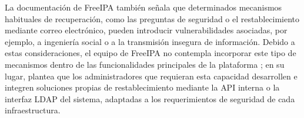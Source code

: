 La documentación de FreeIPA también señala que determinados mecanismos habituales de recuperación, como las preguntas de seguridad o el restablecimiento mediante correo electrónico, pueden introducir vulnerabilidades asociadas, por ejemplo, a ingeniería social o a la transmisión insegura de información. Debido a estas consideraciones, el equipo de FreeIPA no contempla incorporar este tipo de mecanismos dentro de las funcionalidades principales de la plataforma \citep{FreeIPAReset2026}; en su lugar, plantea que los administradores que requieran esta capacidad desarrollen e integren soluciones propias de restablecimiento mediante la \ac{API} interna o la interfaz \ac{LDAP} del sistema, adaptadas a los requerimientos de seguridad de cada infraestructura.
